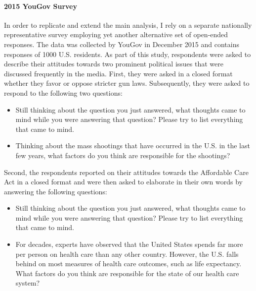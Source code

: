 \paragraph{2015 YouGov Survey}
In order to replicate and extend the main analysis, I rely on a separate nationally representative survey employing yet another alternative set of open-ended responses. The data was collected by YouGov in December 2015 and contains responses of 1000 U.S. residents. %
As part of this study, respondents were asked to describe their attitudes towards two prominent political issues that were discussed frequently in the media. First, they were asked in a closed format whether they favor or oppose stricter gun laws. Subsequently, they were asked to respond to the following two questions:
\begin{itemize}\setlength\itemsep{0em}
	\item Still thinking about the question you just answered, what thoughts came to mind while you were answering that question? Please try to list everything that came to mind.
	\item Thinking about the mass shootings that have occurred in the U.S. in the last few years, what factors do you think are responsible for the shootings?
\end{itemize}
Second, the respondents reported on their attitudes towards the Affordable Care Act in a closed format and were then asked to elaborate in their own words by answering the following questions:
\begin{itemize}\setlength\itemsep{0em}
	\item Still thinking about the question you just answered, what thoughts came to mind while you were answering that question? Please try to list everything that came to mind.
	\item For decades, experts have observed that the United States spends far more per person on health care than any other country. However, the U.S. falls behind on most measures of health care outcomes, such as life expectancy. What factors do you think are responsible for the state of our health care system?
\end{itemize}

